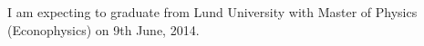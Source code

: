 \documentclass[12pt]{article}
\begin{document}
\maketitle
I am expecting to graduate from Lund University with Master of Physics
(Econophysics) on 9th June, 2014.
\end{document}
